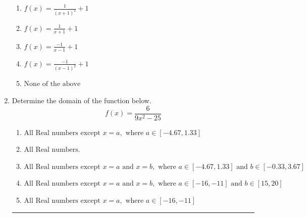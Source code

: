 \documentclass[14pt]{extbook}
\newcommand{\litem}[1]{\item#1\hspace*{-1cm}\rule{\textwidth}{0.4pt}}
\begin{document}
\begin{enumerate}
{\begin{center}
\end{center}
\begin{enumerate}[label=\Alph*.]
\item \( f(x) = \frac{1}{(x + 1)^2} + 1 \)
\item \( f(x) = \frac{1}{x + 1} + 1 \)
\item \( f(x) = \frac{-1}{x - 1} + 1 \)
\item \( f(x) = \frac{-1}{(x - 1)^2} + 1 \)
\item \( \text{None of the above} \)

\end{enumerate} }
\litem{
Determine the domain of the function below.\[ f(x) = \frac{6}{9x^{2} -25} \]\begin{enumerate}[label=\Alph*.]
\item \( \text{All Real numbers except } x = a, \text{ where } a \in [-4.67, 1.33] \)
\item \( \text{All Real numbers.} \)
\item \( \text{All Real numbers except } x = a \text{ and } x = b, \text{ where } a \in [-4.67, 1.33] \text{ and } b \in [-0.33, 3.67] \)
\item \( \text{All Real numbers except } x = a \text{ and } x = b, \text{ where } a \in [-16, -11] \text{ and } b \in [15, 20] \)
\item \( \text{All Real numbers except } x = a, \text{ where } a \in [-16, -11] \)

\end{enumerate} }
\end{enumerate}
\end{document}
